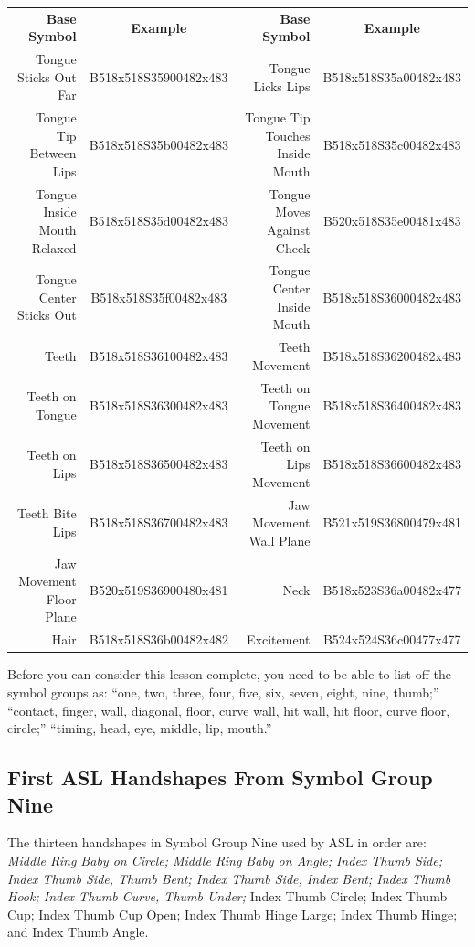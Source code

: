\documentclass{article}
\begin{document}
\begin{center}
\begin{tabular}{rcrc}
\textbf{Base Symbol}&\textbf{Example}&\textbf{Base Symbol}&\textbf{Example}\\
Tongue Sticks Out Far      &B518x518S35900482x483&Tongue Licks Lips              &B518x518S35a00482x483\\
Tongue Tip Between Lips    &B518x518S35b00482x483&Tongue Tip Touches Inside Mouth&B518x518S35c00482x483\\
Tongue Inside Mouth Relaxed&B518x518S35d00482x483&Tongue Moves Against Cheek     &B520x518S35e00481x483\\
Tongue Center Sticks Out   &B518x518S35f00482x483&Tongue Center Inside Mouth     &B518x518S36000482x483\\
Teeth                      &B518x518S36100482x483&Teeth Movement                 &B518x518S36200482x483\\
Teeth on Tongue            &B518x518S36300482x483&Teeth on Tongue Movement       &B518x518S36400482x483\\
Teeth on Lips              &B518x518S36500482x483&Teeth on Lips Movement         &B518x518S36600482x483\\
Teeth Bite Lips            &B518x518S36700482x483&Jaw Movement Wall Plane        &B521x519S36800479x481\\
Jaw Movement Floor Plane   &B520x519S36900480x481&Neck                           &B518x523S36a00482x477\\
Hair                       &B518x518S36b00482x482&Excitement                     &B524x524S36c00477x477\\
\end{tabular}
\end{center}

Before you can consider this lesson complete, you need to be able to list off the symbol groups as:
``one, two, three, four, five, six, seven, eight, nine, thumb;''
``contact, finger, wall, diagonal, floor, curve wall, hit wall, hit floor, curve floor, circle;''
``timing, head, eye, middle, lip, mouth.''

\subsection{First ASL Handshapes From Symbol Group Nine}

The thirteen handshapes in Symbol Group Nine used by ASL in order are:
{\it
Middle Ring Baby on Circle;
Middle Ring Baby on Angle;
Index Thumb Side;
Index Thumb Side, Thumb Bent;
Index Thumb Side, Index Bent;
Index Thumb Hook;
Index Thumb Curve, Thumb Under;
}
Index Thumb Circle;
Index Thumb Cup;
Index Thumb Cup Open;
Index Thumb Hinge Large;
Index Thumb Hinge;
and Index Thumb Angle.
\end{document}
